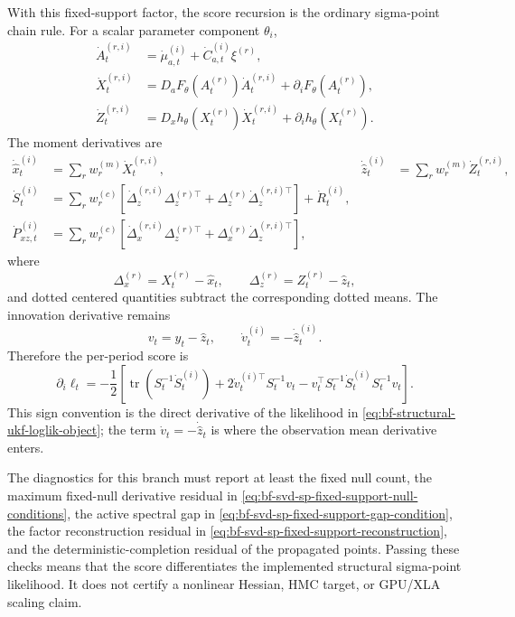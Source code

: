 With this fixed-support factor, the score recursion is the ordinary
sigma-point chain rule.  For a scalar parameter component $\theta_i$,
\begin{align}
\label{eq:bf-svd-sp-structural-point-first}
  \dot A_t^{(r,i)}
  &=
  \dot\mu_{a,t}^{(i)}+\dot C_{a,t}^{(i)}\xi^{(r)},\\
\label{eq:bf-svd-sp-structural-state-point-first}
  \dot X_t^{(r,i)}
  &=
  D_aF_\theta(A_t^{(r)})\dot A_t^{(r,i)}
  +\partial_iF_\theta(A_t^{(r)}),\\
\label{eq:bf-svd-sp-structural-observation-point-first}
  \dot Z_t^{(r,i)}
  &=
  D_xh_\theta(X_t^{(r)})\dot X_t^{(r,i)}
  +\partial_i h_\theta(X_t^{(r)}).
\end{align}
The moment derivatives are
\begin{align}
\label{eq:bf-svd-sp-structural-moment-first}
  \dot{\hat x}_t^{(i)}
    &=\sum_r w_r^{(m)}\dot X_t^{(r,i)},&
  \dot{\hat z}_t^{(i)}
    &=\sum_r w_r^{(m)}\dot Z_t^{(r,i)},\\
\label{eq:bf-svd-sp-structural-S-first}
  \dot S_t^{(i)}
    &=
    \sum_r w_r^{(c)}
    \left[
      \dot\Delta_z^{(r,i)}\Delta_z^{(r)\top}
      +
      \Delta_z^{(r)}\dot\Delta_z^{(r,i)\top}
    \right]
    +\dot R_t^{(i)},\\
\label{eq:bf-svd-sp-structural-cross-first}
  \dot P_{xz,t}^{(i)}
    &=
    \sum_r w_r^{(c)}
    \left[
      \dot\Delta_x^{(r,i)}\Delta_z^{(r)\top}
      +
      \Delta_x^{(r)}\dot\Delta_z^{(r,i)\top}
    \right],
\end{align}
where
\[
  \Delta_x^{(r)}=X_t^{(r)}-\hat x_t,\qquad
  \Delta_z^{(r)}=Z_t^{(r)}-\hat z_t,
\]
and dotted centered quantities subtract the corresponding dotted means.  The
innovation derivative remains
\[
  v_t=y_t-\hat z_t,\qquad
  \dot v_t^{(i)}=-\dot{\hat z}_t^{(i)}.
\]
Therefore the per-period score is
\begin{equation}
\label{eq:bf-svd-sp-structural-score}
  \partial_i\ell_t
  =
  -\frac12
  \left[
    \operatorname{tr}(S_t^{-1}\dot S_t^{(i)})
    +2\dot v_t^{(i)\top}S_t^{-1}v_t
    -v_t^\top S_t^{-1}\dot S_t^{(i)}S_t^{-1}v_t
  \right].
\end{equation}
This sign convention is the direct derivative of the likelihood in
\eqref{eq:bf-structural-ukf-loglik-object}; the term
$\dot v_t=-\dot{\hat z}_t$ is where the observation mean derivative enters.

The diagnostics for this branch must report at least the fixed null count, the
maximum fixed-null derivative residual in
\eqref{eq:bf-svd-sp-fixed-support-null-conditions}, the active spectral gap in
\eqref{eq:bf-svd-sp-fixed-support-gap-condition}, the factor reconstruction
residual in \eqref{eq:bf-svd-sp-fixed-support-reconstruction}, and the
deterministic-completion residual of the propagated points.  Passing these
checks means that the score differentiates the implemented structural
sigma-point likelihood.  It does not certify a nonlinear Hessian, HMC target,
or GPU/XLA scaling claim.

